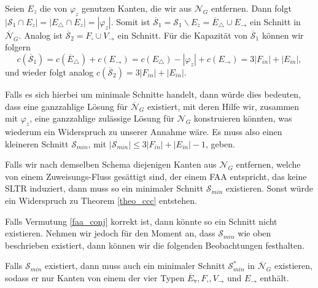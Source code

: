 Seien $E_z$ die von $\varphi_z$ genutzen Kanten, die wir aus $\mathcal{N}_G$ entfernen. Dann folgt $|\mathcal{S}_1 \cap E_z| = |E_\triangle \cap E_z| = |\varphi_z|$. Somit ist $\overline{\mathcal{S}}_1 = \mathcal{S}_1 \backslash E_z = \overline{E}_\triangle \cup E_\to$ ein Schnitt in $\overline{\mathcal{N}}_G$. Analog ist $\overline{\mathcal{S}}_2 = F_\square \cup V_{\to}$ ein Schnitt. Für die Kapazität von $\overline{\mathcal{S}}_1$ können wir folgern 
$$ c(\overline{\mathcal{S}}_1) = c(\overline{E}_\triangle) + c(E_\to) = c(E_\triangle) - |\varphi_z| + c(E_\to) = 3|F_{in}| + |E_{in}|,$$
und wieder folgt analog $c(\overline{\mathcal{S}}_2) = 3|F_{in}| + |E_{in}|$.

Falls es sich hierbei um minimale Schnitte handelt, dann würde dies bedeuten, dass eine ganzzahlige Lösung für $\overline{\mathcal{N}}_G$ existiert, mit deren Hilfe wir, zusammen mit $\varphi_z$, eine ganzzahlige zulässige Lösung für $\mathcal{N}_G$ konstruieren könnten, was wiederum ein Widerspruch zu unserer Annahme wäre. Es muss also einen kleineren Schnitt $\mathcal{S}_{min}$, mit $|\mathcal{S}_{min}| \leq 3|F_{in}| + |E_{in}| - 1$, geben. 

\begin{remark}
Falls wir nach demselben Schema diejenigen Kanten aus $\mathcal{N}_G$ entfernen, welche von einem Zuweisungs-Fluss gesättigt sind, der einem FAA entspricht, das keine SLTR induziert, dann muss so ein minimaler Schnitt $\mathcal{S}_{min}$ existieren. Sonst würde ein Widerspruch zu Theorem \ref{theo_ccc} entstehen.
\end{remark}

Falls Vermutung \ref{faa_conj} korrekt ist, dann könnte so ein Schnitt nicht existieren. Nehmen wir jedoch für den Moment an, dass $\mathcal{S}_{min}$ wie oben beschrieben existiert, dann können wir die folgenden Beobachtungen festhalten.

\begin{claim} \label{cut_types1}
Falls $\mathcal{S}_{min}$ existiert, dann muss auch ein minimaler Schnitt $\mathcal{S}_{min}^*$ in $\overline{\mathcal{N}}_G$ existieren, sodass er nur Kanten von einem der vier Typen $\overline{E}_\triangledown, F_\square, V_\to$ und $E_\to$ enthält.
\end{claim}

